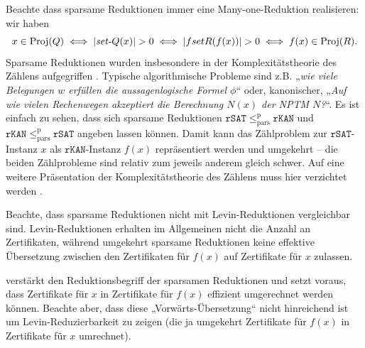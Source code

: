 Beachte dass sparsame Reduktionen immer eine Many-one-Reduktion realisieren: wir haben 
\[ x\in\Proj(Q) \iff |\fset{}Q(x)|>0 \iff |fset{}R(f(x))|>0 \iff f(x)\in\Proj(R). \]
Sparsame Reduktionen wurden insbesondere in der Komplexitätstheorie des Zählens aufgegriffen \parencites{simon_central_1975}{valiant_complexity_1979}. Typische algorithmische Probleme sind z.B. „\emph{wie viele Belegungen $w$ erfüllen die aussagenlogische Formel $\phi$}“ oder, kanonischer, „\emph{Auf wie vielen Rechenwegen akzeptiert die Berechnung $N(x)$ der NPTM $N$?}“. Es ist einfach zu sehen, dass sich sparsame Reduktionen $\mathtt{rSAT}\leq_\mathrm{pars}^\mathrm p \mathtt{rKAN}$ und $\mathtt{rKAN}\leq_\mathrm{pars}^\mathrm p \mathtt{rSAT}$ angeben lassen können. Damit kann das Zählproblem zur $\mathtt{rSAT}$-Instanz $x$ als $\mathtt{rKAN}$-Instanz $f(x)$ repräsentiert werden und umgekehrt -- die beiden Zählprobleme sind relativ zum jeweils anderem gleich schwer. Auf eine weitere Präsentation der Komplexitätstheorie des Zählens muss hier verzichtet werden \parencites(siehe)()[Kap.~7]{wechsung_vorlesungen_2000}[Chap.~17]{arora_computational_2009}.

Beachte, dass sparsame Reduktionen nicht mit Levin-Reduktionen vergleichbar sind. Levin-Reduktionen erhalten im Allgemeinen nicht die Anzahl an Zertifikaten, während umgekehrt sparsame Reduktionen keine effektive Übersetzung zwischen den Zertifikaten für $f(x)$ auf Zertifikate für $x$ zulassen.
%

\textcite{lynch_structure_1978} verstärkt den Reduktionsbegriff der sparsamen Reduktionen und setzt voraus, dass Zertifikate für $x$ in Zertifikate für $f(x)$ effizient umgerechnet werden können. Beachte aber, dass diese „Vorwärts-Übersetzung“ nicht hinreichend ist um Levin-Reduzierbarkeit zu zeigen (die ja umgekehrt Zertifikate für $f(x)$ in Zertifikate für $x$ umrechnet).

